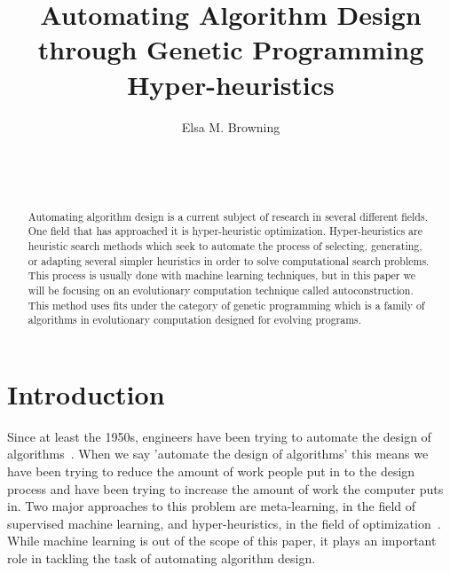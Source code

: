 \documentclass{sig-alternate}
\begin{document}

\title{Automating Algorithm Design through Genetic Programming Hyper-heuristics}


\author{
\alignauthor
Elsa M. Browning\\
	\\
	\\
	\\
}

\maketitle
\begin{abstract}
	Automating algorithm design is a current subject of research in several different fields. One field that has approached it is hyper-heuristic optimization. Hyper-heuristics are heuristic search methods which seek to automate the process of selecting, generating, or adapting several simpler heuristics in order to solve computational search problems. This process is usually done with machine learning techniques, but in this paper we will be focusing on an evolutionary computation technique called autoconstruction. This method uses fits under the category of genetic programming which is a family of algorithms in evolutionary computation designed for evolving programs.
\end{abstract}


\section{Introduction}
\label{sec:introduction}
Since at least the 1950s, engineers have been trying to automate the design of algorithms~\cite{pappa:2014}. When we say 'automate the design of algorithms' this means we have been trying to reduce the amount of work people put in to the design process and have been trying to increase the amount of work the computer puts in. Two major approaches to this problem are meta-learning, in the field of supervised machine learning, and hyper-heuristics, in the field of optimization~\cite{pappa:2014}. While machine learning is out of the scope of this paper, it plays an important role in tackling the task of automating algorithm design.
\end{document}
